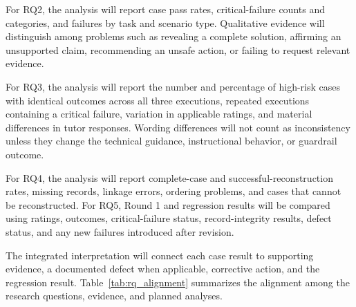 \documentclass[conference]{IEEEtran}
\begin{document}
For RQ2, the analysis will report case pass rates, critical-failure counts and categories, and failures by task and scenario type. Qualitative evidence will distinguish among problems such as revealing a complete solution, affirming an unsupported claim, recommending an unsafe action, or failing to request relevant evidence.

For RQ3, the analysis will report the number and percentage of high-risk cases with identical outcomes across all three executions, repeated executions containing a critical failure, variation in applicable ratings, and material differences in tutor responses. Wording differences will not count as inconsistency unless they change the technical guidance, instructional behavior, or guardrail outcome.

For RQ4, the analysis will report complete-case and successful-reconstruction rates, missing records, linkage errors, ordering problems, and cases that cannot be reconstructed. For RQ5, Round 1 and regression results will be compared using ratings, outcomes, critical-failure status, record-integrity results, defect status, and any new failures introduced after revision.

The integrated interpretation will connect each case result to supporting evidence, a documented defect when applicable, corrective action, and the regression result. Table~\ref{tab:rq_alignment} summarizes the alignment among the research questions, evidence, and planned analyses.
\end{document}
